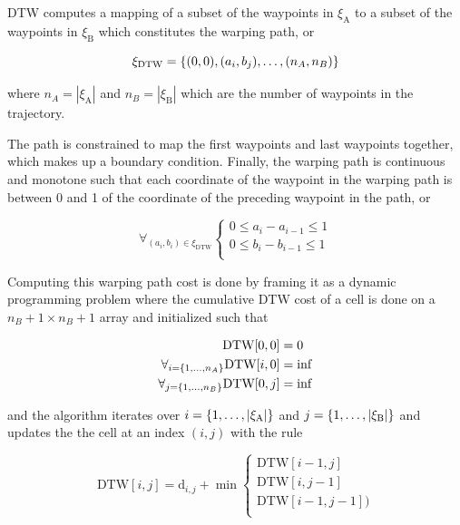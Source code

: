 \documentclass[letterpaper, 10 pt, conference]{ieeeconf}  %
\newcommand{\tj}[1]{\ensuremath{\xi_\text{#1}}}
\begin{document}
DTW computes a mapping of a subset of the waypoints in $\xi_\text{A}$ to a subset of the waypoints in $\xi_\text{B}$ which constitutes the warping path, or

\begin{equation}
\xi_\text{DTW} = \{ (0, 0), (a_i, b_j), \mathellipsis ,(n_A, n_B) \}
\end{equation}

where $n_A = |\tj{A}|$ and $n_B = |\tj{B}|$ which are the number of waypoints in the trajectory.

The path is constrained to map the first waypoints and last waypoints together, which makes up a boundary condition. Finally, the warping path is continuous and monotone such that each coordinate of the waypoint in the warping path is between 0 and 1 of the coordinate of the preceding waypoint in the path, or

\begin{equation}
\forall_{(a_i,b_i) \in \xi_\text{DTW}} 
  \begin{cases}
      0 \leq a_{i} - a_{i-1} \leq 1 \\
      0 \leq b_{i} - b_{i-1} \leq 1 \\
  \end{cases}
\end{equation}

Computing this warping path cost is done by framing it as a dynamic programming problem where the cumulative DTW cost of a cell is done on a $n_B+1 \times n_B+1$ array and initialized such that

\begin{equation}
\begin{aligned}
\text{DTW}[0,0] &= 0 \\
\forall_{i=\{1,\mathellipsis,n_A\}} \text{DTW}[i,0] &= \inf\\
\forall_{j=\{1,\mathellipsis,n_B\}} \text{DTW}[0,j] &= \inf\\
\end{aligned}
\end{equation}

and the algorithm iterates over $i=\{1,\mathellipsis,|\tj{A}|\}$ and $j=\{1,\mathellipsis,|\tj{B}|\}$ and updates the the cell at an index $(i,j)$ with the rule

\begin{equation}
\text{DTW}[i,j] = \text{d}_{i,j} + \min 
  \begin{cases}
    \text{DTW}[i-1,j] \\
    \text{DTW}[i,j-1] \\
    \text{DTW}[i-1,j-1] ) \\
  \end{cases}
\end{equation}
\end{document}
